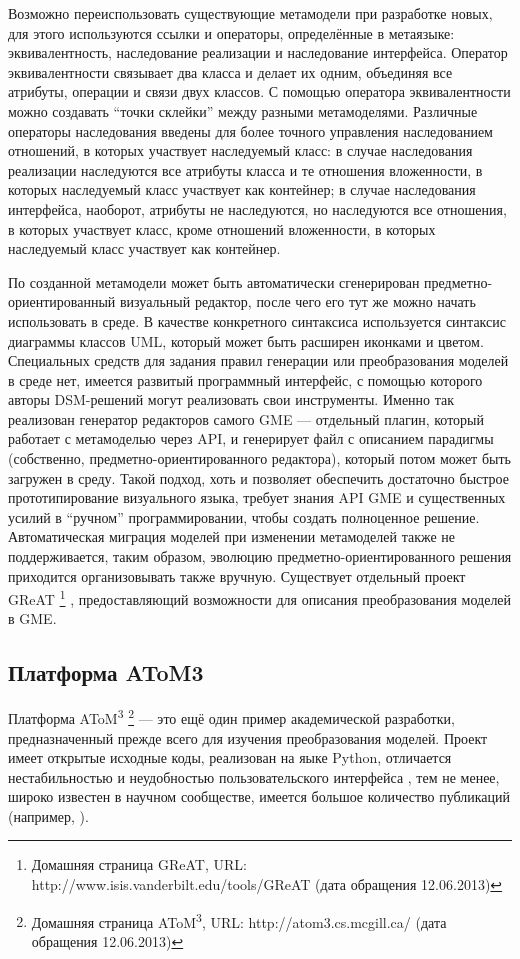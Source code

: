 Возможно переиспользовать существующие метамодели при разработке новых, для этого 
используются ссылки и операторы, определённые в метаязыке: эквивалентность, наследование 
реализации и наследование интерфейса. Оператор эквивалентности связывает два класса 
и делает их одним, объединяя все атрибуты, операции и связи двух классов. С помощью 
оператора эквивалентности можно создавать “точки склейки” между разными метамоделями. 
Различные операторы наследования введены для более точного управления наследованием 
отношений, в которых участвует наследуемый класс: в случае наследования реализации 
наследуются все атрибуты класса и те отношения вложенности, в которых наследуемый 
класс участвует как контейнер; в случае наследования интерфейса, наоборот, атрибуты 
не наследуются, но наследуются все отношения, в которых участвует класс, кроме отношений 
вложенности, в которых наследуемый класс участвует как контейнер.

По созданной метамодели может быть автоматически сгенерирован предметно-ориентированный 
визуальный редактор, после чего его тут же можно начать использовать в среде. В качестве 
конкретного синтаксиса используется синтаксис диаграммы классов UML, который может 
быть расширен иконками и цветом. Специальных средств для задания правил генерации 
или преобразования моделей в среде нет, имеется развитый программный интерфейс, с 
помощью которого авторы DSM-решений могут реализовать свои инструменты. Именно так 
реализован генератор редакторов самого GME --- отдельный плагин, который работает с 
метамоделью через API, и генерирует файл с описанием парадигмы (собственно, предметно-ориентированного 
редактора), который потом может быть загружен в среду. Такой подход, хоть и позволяет 
обеспечить достаточно быстрое прототипирование визуального языка, требует знания API GME 
и существенных усилий в "`ручном"' программировании, чтобы создать полноценное решение. 
Автоматическая миграция моделей при изменении метамоделей также не поддерживается, 
таким образом, эволюцию предметно-ориентированного решения приходится организовывать также вручную. Существует отдельный проект GReAT
\footnote{Домашняя страница GReAT, URL: http://www.isis.vanderbilt.edu/tools/GReAT (дата обращения 12.06.2013)}
, предоставляющий возможности для описания преобразования моделей в GME.

\subsection{Платформа AToM3}
Платформа AToM\textsuperscript{3}
\footnote{Домашняя страница AToM\textsuperscript{3}, URL: http://atom3.cs.mcgill.ca/ (дата обращения 12.06.2013)}
--- это ещё один пример академической разработки, предназначенный прежде всего для изучения преобразования моделей. Проект имеет открытые 
исходные коды, реализован на яыке Python, отличается нестабильностью и неудобностью пользовательского интерфейса
, тем не менее, широко известен в научном сообществе, имеется большое количество публикаций (например, \cite{vangheluwe2004domain}).


